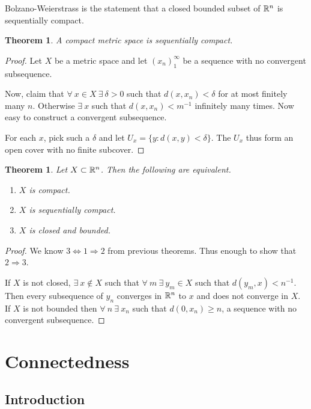 \documentclass{notes}
\theoremstyle{plain}
\newtheorem{theorem}[proposition]{Theorem}
\begin{document}
Bolzano-Weierstrass is the statement that a closed bounded subset of $\mathbb{R}^n$
is sequentially compact.

\begin{theorem}
A compact metric space is sequentially compact.
\end{theorem}

\begin{proof}
Let $X$ be a metric space and let $(x_n)_1^\infty$ be a sequence with no
convergent subsequence.

Now, claim that $\forall\ x \in X\ \exists\ \delta > 0$ such that
$d(x,x_n) < \delta$ for at most finitely many $n$.  Otherwise $\exists\ x$
such that $d(x,x_n) < m^{-1}$ infinitely many times.  Now easy to construct
a convergent subsequence.

For each $x$, pick such a $\delta$ and let $U_x = \{y : d(x,y) < \delta \}$.
The $U_x$ thus form an open cover with no finite subcover.
\end{proof}

\begin{theorem}
Let $X \subset \mathbb{R}^n$.  Then the following are equivalent.
\begin{enumerate}
\item $X$ is compact.
\item $X$ is sequentially compact.
\item $X$ is closed and bounded.
\end{enumerate}
\end{theorem}

\begin{proof}
We know $3 \Leftrightarrow 1 \Rightarrow 2$ from previous theorems.  Thus
enough to show that $2 \Rightarrow 3$.

If $X$ is not closed, $\exists\ x \notin X$ such that $\forall\ m \
\exists\ y_m \in X$ such that $d(y_m,x) < n^{-1}$.  Then every subsequence
of $y_n$ converges in $\mathbb{R}^n$ to $x$ and does not converge in $X$.  If $X$ is
not bounded then $\forall\ n\  \exists\ x_n$ such that $d(0,x_n) \ge n$,
a sequence with no convergent subsequence.
\end{proof}

\chapter{Connectedness}

\section{Introduction}
\end{document}
